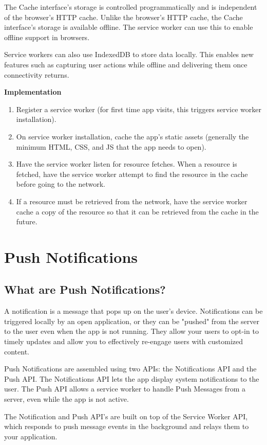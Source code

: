 \documentclass[14pt,a4paper,final]{extreport}
\begin{document}
The Cache interface's storage is controlled programmatically and is independent of the browser's HTTP cache. Unlike the browser's HTTP cache, the Cache interface's storage is available offline. The service worker can use this to enable offline support in browsers.

Service workers can also use IndexedDB to store data locally. This enables new features such as capturing user actions while offline and delivering them once connectivity returns.
\item \textbf{Implementation}
\begin{enumerate}
    \item Register a service worker (for first time app visits, this triggers service worker installation).
    \item On service worker installation, cache the app's static assets (generally the minimum HTML, CSS, and JS that the app needs to open).
    \item Have the service worker listen for resource fetches. When a resource is fetched, have the service worker attempt to find the resource in the cache before going to the network.
    \item If a resource must be retrieved from the network, have the service worker cache a copy of the resource so that it can be retrieved from the cache in the future.
\end{enumerate}
\newpage  \section{Push Notifications}
\subsection{What are Push Notifications?}
\item A notification is a message that pops up on the user's device. Notifications can be triggered locally by an open application, or they can be "pushed" from the server to the user even when the app is not running. They allow your users to opt-in to timely updates and allow you to effectively re-engage users with customized content.

Push Notifications are assembled using two APIs: the Notifications API and the Push API. The Notifications API lets the app display system notifications to the user. The Push API allows a service worker to handle Push Messages from a server, even while the app is not active.

The Notification and Push API's are built on top of the Service Worker API, which responds to push message events in the background and relays them to your application.
\end{document}

